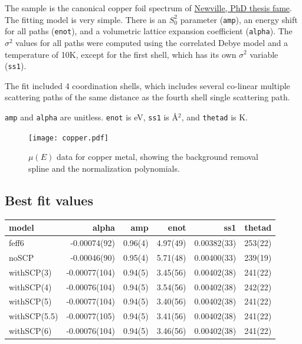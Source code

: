 \documentclass[11pt]{article}
\begin{document}
The sample is the canonical copper foil spectrum of
\href{https://github.com/XraySpectroscopy/XAS-Data-Interchange/issues/29}{Newville,
  PhD thesis fame}. The fitting model is very simple. There is an
$S_0^2$ parameter (\texttt{amp}), an energy shift for all paths
(\texttt{enot}), and a volumetric lattice expansion coefficient
(\texttt{alpha}). The $\sigma^2$ values for all paths were computed
using the correlated Debye model and a temperature of 10K, except for
the first shell, which has its own $\sigma^2$ variable (\texttt{ss1}).

The fit included 4 coordination shells, which includes several co-linear
multiple scattering paths of the same distance as the fourth shell
single scattering path.

\texttt{amp} and \texttt{alpha} are unitless. \texttt{enot} is eV,
\texttt{ss1} is {\AA}$^2$, and \texttt{thetad} is K.

\begin{figure}[h]
  \centering
  \texttt{[image: copper.pdf]} 
  \caption{$\mu(E)$ data for copper metal, showing the background
    removal spline and the normalization polynomials.}
  \label{fig:copper-data}
\end{figure}

\subsection{Best fit values}
\label{sec:orgheadline2}

\begin{center}
  \begin{tabular}{lrrrrr}
    model & alpha & amp & enot & ss1 & thetad\\
    \hline
    feff6        & -0.00074(92)  & 0.96(4) & 4.97(49) & 0.00382(33) & 253(22)\\
    noSCP        & -0.00046(90)  & 0.95(4) & 5.71(48) & 0.00400(33) & 239(19)\\
    withSCP(3)   & -0.00077(104) & 0.94(5) & 3.45(56) & 0.00402(38) & 241(22)\\
    withSCP(4)   & -0.00076(104) & 0.94(5) & 3.54(56) & 0.00402(38) & 242(22)\\
    withSCP(5)   & -0.00077(104) & 0.94(5) & 3.40(56) & 0.00402(38) & 241(22)\\
    withSCP(5.5) & -0.00077(105) & 0.94(5) & 3.41(56) & 0.00402(38) & 241(22)\\
    withSCP(6)   & -0.00076(104) & 0.94(5) & 3.46(56) & 0.00402(38) & 241(22)\\
  \end{tabular}
\end{center}
\end{document}
